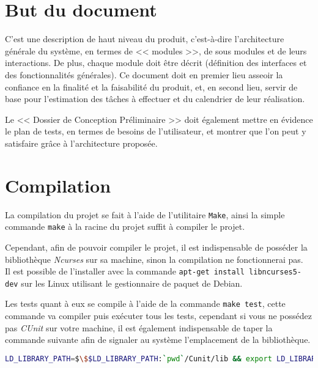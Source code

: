 \documentclass[12pt,a4paper,openany]{article}
\begin{document}
	\setcounter{tocdepth}{2}
	\setcounter{secnumdepth}{3}
	\maketitle
	\tableofcontents
	\newpage
	\section{But du document}
	C'est une description de haut niveau du produit, c'est-à-dire l'architecture générale du système, en termes de << modules >>, de sous modules et de leurs
	interactions. De plus, chaque module doit être décrit (définition des interfaces et des fonctionnalités générales). Ce document doit en premier lieu asseoir
	la confiance en la finalité et la faisabilité du produit, et, en second lieu, servir de base pour l'estimation des tâches à effectuer et du calendrier de
	leur réalisation.

	Le << Dossier de Conception Préliminaire >> doit également mettre en évidence le plan de tests, en termes de besoins de l'utilisateur, et montrer que l'on peut
	y satisfaire grâce à l'architecture proposée.
	\section{Compilation}
	La compilation du projet se fait à l'aide de l'utilitaire \texttt{Make}, ainsi la simple
	commande \texttt{make} à la racine du projet suffit à compiler le projet.

	Cependant, afin de pouvoir compiler le projet, il est indispensable de posséder la
	bibliothèque \textit{Ncurses} sur sa machine, sinon la compilation ne fonctionnerai pas.\\ 
	Il est possible de l'installer avec la commande \texttt{apt-get install libncurses5-dev}
	sur les Linux utilisant le gestionnaire de paquet de Debian.

	Les tests quant à eux se compile à l'aide de la commande \texttt{make test}, cette
	commande va compiler puis exécuter tous les tests, cependant si vous ne possédez pas
	\textit{CUnit} sur votre machine, il est également indispensable de taper la commande
	suivante afin de signaler au système l'emplacement de la bibliothèque.

	\begin{lstlisting}[language=sh,numbers=none]
LD_LIBRARY_PATH=$\$$LD_LIBRARY_PATH:`pwd`/Cunit/lib && export LD_LIBRARY_PATH		
	\end{lstlisting}
\end{document}
